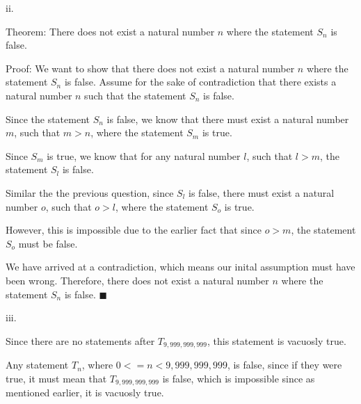 \documentclass{article}
\renewcommand{\(}{\left(}
\renewcommand{\)}{\right)}
\theoremstyle{plain}
\theoremstyle{plain}
\theoremstyle{definition}
\begin{document}
    ii.
    \begin{shaded}
                Theorem: There does not exist a natural number $n$ where the statement $S_{n}$ is false.

                \vspace{4mm}

                Proof: We want to show that there does not exist a natural number $n$ where the statement $S_{n}$ is false. Assume for the sake of contradiction that there exists a natural number $n$ such that the statement $S_{n}$ is false.

                \vspace{4mm}

                Since the statement $S_{n}$ is false, we know that there must exist a natural number $m$, such that $m>n$, where the statement $S_{m}$ is true.

                \vspace{4mm} 

                Since $S_{m}$ is true, we know that for any natural number $l$, such that $l>m$, the statement $S_{l}$ is false.
                
                \vspace{4mm}                

                Similar the the previous question, since $S_{l}$ is false, there must exist a natural number $o$, such that $o>l$, where the statement $S_{o}$ is true.
                
                \vspace{4mm}

                However, this is impossible due to the earlier fact that since $o>m$, the statement $S_{o}$ must be false.
               
                \vspace{4mm}

                We have arrived at a contradiction, which means our inital assumption must have been wrong. Therefore, there does not exist a natural number $n$ where the statement $S_{n}$ is false. $\blacksquare$
    \end{shaded}
    
    iii.
    \begin{shaded}
                            Since there are no statements after $T_{9,999,999,999}$, this statement is vacuosly true.

                            \vspace{4mm}

                            Any statement $T_{n}$, where $0<=n<9,999,999,999$, is false, since if they were true, it must mean that $T_{9,999,999,999}$ is false, which is impossible since as mentioned earlier, it is vacuosly true.
    \end{shaded}
\end{document}
